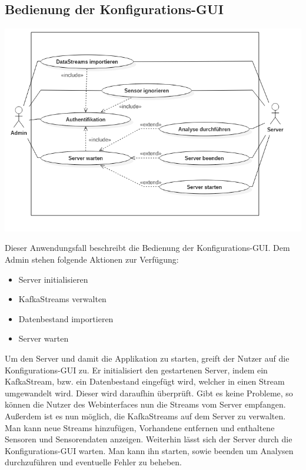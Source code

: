     \subsection{Bedienung der Konfigurations-GUI}
        \includegraphics[width=1\linewidth]{diagrams/UseCaseDiagram2.png}
        
        Dieser Anwendungsfall beschreibt die Bedienung der Konfigurations-GUI. Dem Admin stehen folgende Aktionen zur Verfügung:
        \begin{itemize}
            \item Server initialisieren
            \item KafkaStreams verwalten
            \item Datenbestand importieren
            \item Server warten
        \end{itemize}
        Um den Server und damit die Applikation zu starten, greift der Nutzer auf die Konfigurations-GUI zu. Er initialisiert den gestartenen 
        Server, indem ein KafkaStream, bzw. ein Datenbestand eingefügt wird, welcher in einen Stream umgewandelt wird. Dieser wird 
        daraufhin überprüft. Gibt es keine Probleme, so können die Nutzer des Webinterfaces nun die Streams vom Server empfangen. Außerdem ist 
        es nun möglich, die KafkaStreams auf dem Server zu verwalten. Man kann neue Streams hinzufügen, Vorhandene entfernen und 
        enthaltene Sensoren und Sensorendaten anzeigen. Weiterhin lässt sich der Server durch die Konfigurations-GUI warten. Man kann ihn 
        starten, sowie beenden um Analysen durchzuführen und eventuelle Fehler zu beheben.
        
